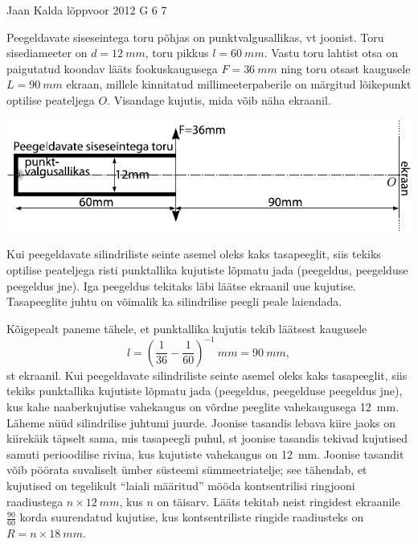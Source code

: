 {Jaan Kalda} %
{lõppvoor} %
{2012} %
{G 6} %
{7} %
{
\ifStatement
Peegeldavate siseseintega toru põhjas on punktvalgusallikas, vt joonist. Toru
sisediameeter on
$d=\SI{12}{mm}$, toru pikkus $l=\SI{60}{mm}$. Vastu toru lahtist otsa on
paigutatud koondav lääts fookuskaugusega $F=\SI{36}{mm}$ ning toru otsast
kaugusele $L=\SI{90}{mm}$ ekraan, millele kinnitatud millimeeterpaberile
on märgitud lõikepunkt optilise peateljega $O$.
Visandage kujutis, mida võib näha ekraanil.

\begin{center}
\includegraphics[width=\textwidth]{2012-v3g-06-toru-valgusallikas-lxxts}
\end{center}
\fi


\ifHint
Kui peegeldavate silindriliste seinte asemel oleks kaks tasapeeglit, siis
tekiks optilise peateljega risti punktallika kujutiste lõpmatu jada (peegeldus, peegelduse peegeldus jne). Iga peegeldus tekitaks läbi läätse ekraanil uue kujutise. Tasapeeglite juhtu on võimalik ka silindrilise peegli peale laiendada.
\fi


\ifSolution
Kõigepealt paneme tähele, et punktallika kujutis tekib läätsest kaugusele
$$l=\left(\frac 1{36}-\frac 1{60}\right)^{-1}\SI{}{mm}=\SI{90}{mm},$$
st ekraanil. Kui peegeldavate silindriliste seinte asemel oleks kaks tasapeeglit, siis
tekiks punktallika kujutiste lõpmatu jada (peegeldus, peegelduse peegeldus jne), kus 
kahe naaberkujutise vahekaugus on võrdne peeglite vahekaugusega \SI{12}{mm}. 
Läheme nüüd silindrilise juhtumi juurde. Joonise tasandis lebava kiire jaoks on 
kiirekäik täpselt sama, mis tasapeegli puhul, st joonise tasandis tekivad kujutised samuti 
perioodilise rivina, kus kujutiste vahekaugus on \SI{12}{mm}. Joonise tasandit võib pöörata suvaliselt
ümber süsteemi sümmeetriatelje; see tähendab, et kujutised on tegelikult \enquote{laiali määritud} mööda kontsentrilisi
ringjooni raadiustega $n\times\SI{12}{mm}$, kus $n$ on täisarv. Lääts tekitab neist ringidest 
ekraanile $\frac{90}{60}$ korda suurendatud kujutise, 
kus kontsentriliste ringide raadiusteks on $R=n\times \SI{18}{mm}$.
\fi


}
